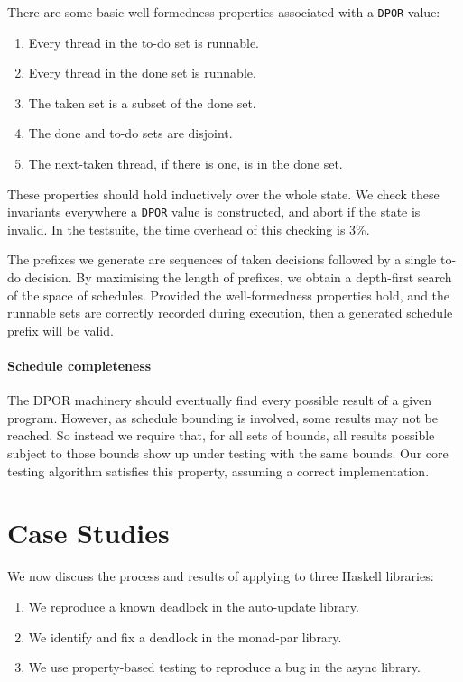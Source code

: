 There are some basic well-formedness properties associated with a
\verb|DPOR| value:

\begin{enumerate}
\item Every thread in the to-do set is runnable.
\item Every thread in the done set is runnable.
\item The taken set is a subset of the done set.
\item The done and to-do sets are disjoint.
\item The next-taken thread, if there is one, is in the done set.
\end{enumerate}

These properties should hold inductively over the whole state.  We
check these invariants everywhere a \verb|DPOR| value is constructed,
and abort if the state is invalid.  In the \dejafu{} testsuite, the
time overhead of this checking is 3\%.

The prefixes we generate are sequences of taken decisions followed by
a single to-do decision.  By maximising the length of prefixes, we
obtain a depth-first search of the space of schedules.  Provided the
well-formedness properties hold, and the runnable sets are correctly
recorded during execution, then a generated schedule prefix will be
valid.

\paragraph{Schedule completeness}
The DPOR machinery should eventually find every possible result of a
given program.  However, as schedule bounding is involved, some
results may not be reached.  So instead we require that, for all sets
of bounds, all results possible subject to those bounds show up under
testing with the same bounds.  Our core testing algorithm satisfies
this property\cite{coons2013}, assuming a correct implementation.

\section{Case Studies}
\label{sec:dejafu-casestudies}

We now discuss the process and results of applying \dejafu{} to three
Haskell libraries:

\begin{enumerate}
\item We reproduce a known deadlock in the auto-update
  library\cite{auto_update}.
\item We identify and fix a deadlock in the monad-par
  library\cite{monad_par,marlow2011}.
\item We use property-based testing to reproduce a bug in the async
  library\cite{async}.
\end{enumerate}

